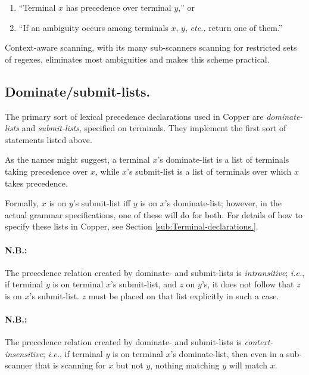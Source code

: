 \documentclass[12pt,english,twoside]{report}
\newcommand\sectionname{Section}
\begin{document}
\begin{enumerate}
\item {}``Terminal $x$ has precedence over terminal $y$,'' or
\item {}``If an ambiguity occurs among terminals $x$, $y$, \emph{etc.,}
return one of them.''
\end{enumerate}
Context-aware scanning, with its many sub-scanners scanning for restricted
sets of regexes, eliminates most ambiguities and makes this scheme
practical.


\subsection{Dominate/submit-lists.}

The primary sort of lexical precedence declarations used in Copper
are \emph{dominate-lists} and \emph{submit-lists}, specified on terminals.
They implement the first sort of statements listed above.

As the names might suggest, a terminal $x$'s dominate-list is a list
of terminals taking precedence over $x$, while $x$'s submit-list
is a list of terminals over which $x$ takes precedence.

Formally, $x$ is on $y$'s submit-list iff $y$ is on $x$'s dominate-list;
however, in the actual grammar specifications, one of these will do
for both. For details of how to specify these lists in Copper, see
\sectionname{} \ref{sub:Terminal-declarations.}.


\paragraph{N.B.:}

The precedence relation created by dominate- and submit-lists is \emph{intransitive};
\emph{i.e.}, if terminal $y$ is on terminal $x$'s submit-list, and
$z$ on $y$'s, it does not follow that $z$ is on $x$'s submit-list.
$z$ must be placed on that list explicitly in such a case.


\paragraph{N.B.:}

The precedence relation created by dominate- and submit-lists is \emph{context-insensitive};
\emph{i.e.}, if terminal $y$ is on terminal $x$'s dominate-list,
then even in a sub-scanner that is scanning for $x$ but not $y$,
nothing matching $y$ will match $x$.
\end{document}
